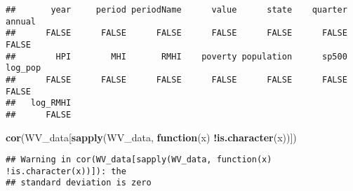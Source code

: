 \documentclass[
]{article}
\newenvironment{Shaded}{\begin{snugshade}}{\end{snugshade}}
\newcommand{\ControlFlowTok}[1]{\textcolor[rgb]{0.13,0.29,0.53}{\textbf{#1}}}
\newcommand{\KeywordTok}[1]{\textcolor[rgb]{0.13,0.29,0.53}{\textbf{#1}}}
\newcommand{\NormalTok}[1]{#1}
\newcommand{\OperatorTok}[1]{\textcolor[rgb]{0.81,0.36,0.00}{\textbf{#1}}}
\begin{document}
\begin{verbatim}
##       year     period periodName      value      state    quarter     annual 
##      FALSE      FALSE      FALSE      FALSE      FALSE      FALSE      FALSE 
##        HPI        MHI       RMHI    poverty population      sp500    log_pop 
##      FALSE      FALSE      FALSE      FALSE      FALSE      FALSE      FALSE 
##   log_RMHI 
##      FALSE
\end{verbatim}

\begin{Shaded}
\begin{Highlighting}[]
\KeywordTok{cor}\NormalTok{(WV_data[}\KeywordTok{sapply}\NormalTok{(WV_data, }\ControlFlowTok{function}\NormalTok{(x) }\OperatorTok{!}\KeywordTok{is.character}\NormalTok{(x))])}
\end{Highlighting}
\end{Shaded}

\begin{verbatim}
## Warning in cor(WV_data[sapply(WV_data, function(x) !is.character(x))]): the
## standard deviation is zero
\end{verbatim}
\end{document}
